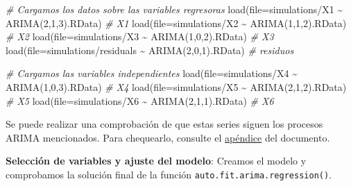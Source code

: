 \documentclass[
  12pt,
  a4paper]{article}
\newenvironment{Shaded}{\begin{snugshade}}{\end{snugshade}}
\newcommand{\AttributeTok}[1]{\textcolor[rgb]{0.77,0.63,0.00}{#1}}
\newcommand{\CommentTok}[1]{\textcolor[rgb]{0.56,0.35,0.01}{\textit{#1}}}
\newcommand{\FunctionTok}[1]{\textcolor[rgb]{0.00,0.00,0.00}{#1}}
\newcommand{\NormalTok}[1]{#1}
\newcommand{\StringTok}[1]{\textcolor[rgb]{0.31,0.60,0.02}{#1}}
\begin{document}
\begin{Shaded}
\begin{Highlighting}[]
\CommentTok{\# Cargamos los datos sobre las variables regresoras}
\FunctionTok{load}\NormalTok{(}\AttributeTok{file=}\StringTok{\textquotesingle{}simulations/X1 \textasciitilde{} ARIMA(2,1,3).RData\textquotesingle{}}\NormalTok{)        }\CommentTok{\# X1}
\FunctionTok{load}\NormalTok{(}\AttributeTok{file=}\StringTok{\textquotesingle{}simulations/X2 \textasciitilde{} ARIMA(1,1,2).RData\textquotesingle{}}\NormalTok{)        }\CommentTok{\# X2}
\FunctionTok{load}\NormalTok{(}\AttributeTok{file=}\StringTok{\textquotesingle{}simulations/X3 \textasciitilde{} ARIMA(1,0,2).RData\textquotesingle{}}\NormalTok{)        }\CommentTok{\# X3}
\FunctionTok{load}\NormalTok{(}\AttributeTok{file=}\StringTok{\textquotesingle{}simulations/residuals \textasciitilde{} ARIMA(2,0,1).RData\textquotesingle{}}\NormalTok{) }\CommentTok{\# residuos}

\CommentTok{\# Cargamos las variables independientes}
\FunctionTok{load}\NormalTok{(}\AttributeTok{file=}\StringTok{\textquotesingle{}simulations/X4 \textasciitilde{} ARIMA(1,0,3).RData\textquotesingle{}}\NormalTok{)        }\CommentTok{\# X4}
\FunctionTok{load}\NormalTok{(}\AttributeTok{file=}\StringTok{\textquotesingle{}simulations/X5 \textasciitilde{} ARIMA(2,1,2).RData\textquotesingle{}}\NormalTok{)        }\CommentTok{\# X5}
\FunctionTok{load}\NormalTok{(}\AttributeTok{file=}\StringTok{\textquotesingle{}simulations/X6 \textasciitilde{} ARIMA(2,1,1).RData\textquotesingle{}}\NormalTok{)        }\CommentTok{\# X6}
\end{Highlighting}
\end{Shaded}

Se puede realizar una comprobación de que estas series siguen los
procesos ARIMA mencionados. Para chequearlo, consulte el
\protect\hyperlink{apendice}{apéndice} del documento.

\textbf{Selección de variables y ajuste del modelo}: Creamos el modelo y
comprobamos la solución final de la función
\texttt{auto.fit.arima.regression()}.
\end{document}
